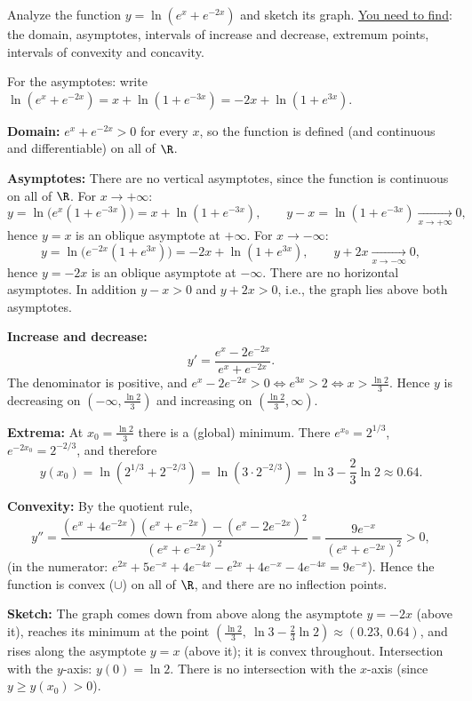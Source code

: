 
\begin{question}
Analyze the function $y=\ln(e^x+e^{-2x})$ and sketch its graph.
\underline{You need to find}: the domain, asymptotes, intervals of increase and decrease, extremum points, intervals of convexity and concavity.
\end{question}

\begin{hint}
For the asymptotes: write $\ln(e^x+e^{-2x})=x+\ln(1+e^{-3x})=-2x+\ln(1+e^{3x})$.
\end{hint}

\begin{solution}
\textbf{Domain:} $e^x+e^{-2x}>0$ for every $x$, so the function is defined (and continuous and differentiable) on all of $\R$.

\textbf{Asymptotes:} There are no vertical asymptotes, since the function is continuous on all of $\R$.
For $x\to+\infty$:
\[
y=\ln\big(e^x(1+e^{-3x})\big)=x+\ln(1+e^{-3x}),\qquad y-x=\ln(1+e^{-3x})\xrightarrow[x\to+\infty]{}0,
\]
hence $y=x$ is an oblique asymptote at $+\infty$.
For $x\to-\infty$:
\[
y=\ln\big(e^{-2x}(1+e^{3x})\big)=-2x+\ln(1+e^{3x}),\qquad y+2x\xrightarrow[x\to-\infty]{}0,
\]
hence $y=-2x$ is an oblique asymptote at $-\infty$. There are no horizontal asymptotes. In addition $y-x>0$ and $y+2x>0$, i.e., the graph lies above both asymptotes.

\textbf{Increase and decrease:}
\[
y'=\frac{e^x-2e^{-2x}}{e^x+e^{-2x}}.
\]
The denominator is positive, and $e^x-2e^{-2x}>0\iff e^{3x}>2\iff x>\frac{\ln2}{3}$.
Hence $y$ is decreasing on $\left(-\infty,\frac{\ln 2}{3}\right)$ and increasing on $\left(\frac{\ln2}{3},\infty\right)$.

\textbf{Extrema:} At $x_0=\frac{\ln2}{3}$ there is a (global) minimum. There $e^{x_0}=2^{1/3}$, $e^{-2x_0}=2^{-2/3}$, and therefore
\[
y(x_0)=\ln\left(2^{1/3}+2^{-2/3}\right)=\ln\left(3\cdot2^{-2/3}\right)=\ln3-\frac23\ln2\approx0.64.
\]

\textbf{Convexity:} By the quotient rule,
\[
y''=\frac{(e^x+4e^{-2x})(e^x+e^{-2x})-(e^x-2e^{-2x})^2}{(e^x+e^{-2x})^2}
=\frac{9e^{-x}}{(e^x+e^{-2x})^2}>0,
\]
(in the numerator: $e^{2x}+5e^{-x}+4e^{-4x}-e^{2x}+4e^{-x}-4e^{-4x}=9e^{-x}$). Hence the function is convex ($\cup$) on all of $\R$, and there are no inflection points.

\textbf{Sketch:} The graph comes down from above along the asymptote $y=-2x$ (above it), reaches its minimum at the point $\left(\frac{\ln2}{3},\ \ln3-\frac23\ln2\right)\approx(0.23,\,0.64)$, and rises along the asymptote $y=x$ (above it); it is convex throughout. Intersection with the $y$-axis: $y(0)=\ln2$. There is no intersection with the $x$-axis (since $y\ge y(x_0)>0$).
\end{solution}
